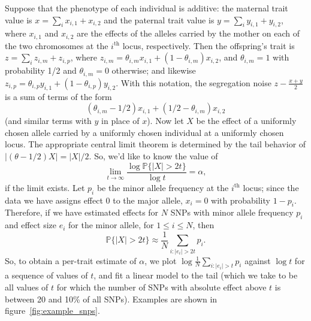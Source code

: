 \documentclass{article}
\renewcommand{\P}{\mathbb{P}}
\theoremstyle{remark}
\theoremstyle{definition}
\begin{document}
Suppose that the phenotype of each individual is additive:
the maternal trait value is $x = \sum_i x_{i,1} + x_{i,2}$
and the paternal trait value is $y = \sum_i y_{i,1} + y_{i,2}$,
where $x_{i,1}$ and $x_{i,2}$ are the effects of the alleles carried
by the mother on each of the two chromosomes
at the $i^\text{th}$ locus, respectively.
Then the offspring's trait is $z = \sum_i z_{i,m} + z_{i,p}$,
where $z_{i,m} = \theta_{i,m} x_{i,1} + (1-\theta_{i,m}) x_{i,2}$,
and $\theta_{i,m} = 1$ with probability 1/2 and $\theta_{i,m} = 0$ otherwise;
and likewise $z_{i,p} = \theta_{i,p} y_{i,1} + (1-\theta_{i,p}) y_{i,2}$.
With this notation, the segregation noise $z - \frac{x+y}{2}$
is a sum of terms of the form
$$
    \left( \theta_{i,m} - 1/2 \right) x_{i,1}
    + \left( 1/2 - \theta_{i,m} \right) x_{i,2} 
$$
(and similar terms with $y$ in place of $x$).
Now let $X$ be the effect of a uniformly chosen allele carried by a uniformly chosen individual
at a uniformly chosen locus.
The appropriate central limit theorem is determined by the tail behavior of $|(\theta - 1/2) X| = |X|/2$.
So, we'd like to know the value of
$$
    \lim_{t \to \infty} \frac{ \log \P\{ |X| > 2 t \} }{ \log t } = \alpha ,
$$
if the limit exists.
Let $p_i$ be the minor allele frequency at the $i^\text{th}$ locus;
since the data we have assigns effect 0 to the major allele,
$x_i = 0$ with probability $1-p_i$.
Therefore, if we have estimated effects for $N$ SNPs
with minor allele frequency $p_i$ and effect size $e_i$ for the minor allele,
for $1 \le i \le N$,
then
$$
    \P\{ |X| > 2t \} \approx \frac{1}{N} \sum_{i : |e_i| > 2t} p_i .
$$
So, to obtain a per-trait estimate of $\alpha$,
we plot $\log \frac{1}{N} \sum_{i : |e_i| > t} p_i$ against $\log t$
for a sequence of values of $t$,
and fit a linear model to the tail
(which we take to be all values of $t$ for which the number of SNPs with absolute effect above $t$
is between 20 and 10\% of all SNPs).
Examples are shown in figure~\ref{fig:example_snps}.
\end{document}

